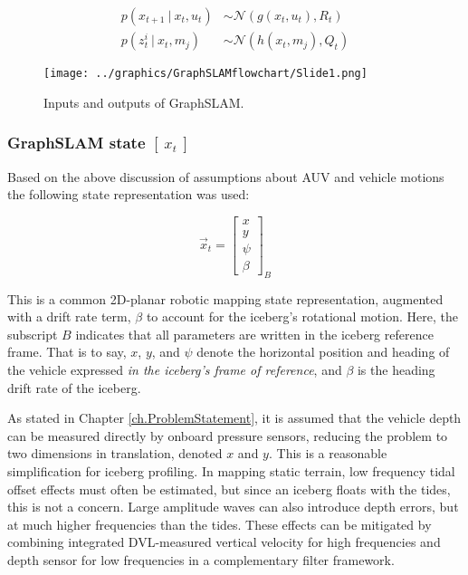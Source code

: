 \begin{align}
p\left(x_{t+1}~|~x_t,u_t\right) & \sim \mathcal{N}\left(g(x_t,u_t), R_t\right) \\
p\left(z^i_{t}~|~x_t,m_j\right) & \sim \mathcal{N}\left(h(x_t,m_j), Q_t\right)
\end{align}

\begin{figure}[htb]
   \centering
   \texttt{[image: ../graphics/GraphSLAMflowchart/Slide1.png]} %
   \caption{Inputs and outputs of GraphSLAM.}
   \label{fig:GraphSLAMIO}
\end{figure}

\subsubsection{GraphSLAM state $\left[~x_t~\right]$}

Based on the above discussion of assumptions about AUV and vehicle motions the following state representation was used:

\begin{equation}
\label{eq.state}
\vec{x}_t= \left[\begin{array}{c}
                     x \\ y \\ \psi \\ \beta 
                     \end{array}\right]_B
\end{equation}

This is a common 2D-planar robotic mapping state representation, augmented with a drift rate term, $\beta$ to account for the iceberg's rotational motion. Here, the subscript $B$ indicates that all parameters are written in the iceberg reference frame. That is to say, $x$, $y$, and $\psi$ denote the horizontal position and heading of the vehicle expressed \emph{in the iceberg's frame of reference}, and $\beta$ is the heading drift rate of the iceberg. 

As stated in Chapter \ref{ch.ProblemStatement}, it is assumed that the vehicle depth can be measured directly by onboard pressure sensors, reducing the problem to two dimensions in translation, denoted $x$ and $y$. This is a reasonable simplification for iceberg profiling. In mapping static terrain, low frequency tidal offset effects must often be estimated, but since an iceberg floats with the tides, this is not a concern. Large amplitude waves can also introduce depth errors, but at much higher frequencies than the tides. These effects can be mitigated by combining integrated DVL-measured vertical velocity for high frequencies and depth sensor for low frequencies in a complementary filter framework.

